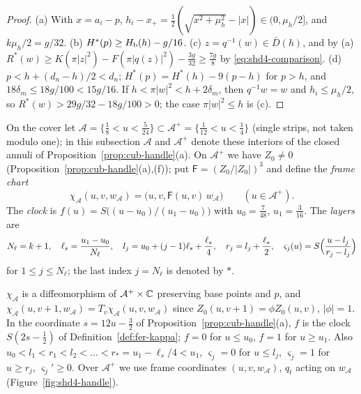 \begin{proof}
(a) With $x=a_i-p$, $h_i-x_+=\frac12(\sqrt{x^2+\mu_h^2}-|x|)\in(0,\mu_h/2]$, and $k\mu_h/2=g/32$.
(b) $H^*(p)\ge H_{\mathrm b}(h)-g/16$.
(c) $z=q^{-1}(w)\in\bar D(h)$, and by (a) $R^*(w)\ge K(\pi|z|^2)-F(\pi|q(z)|^2)-\tfrac{3g}{32}\ge\tfrac{7g}8$ by \eqref{eq:shd4-comparison}.
(d) $p<h+(d_n-h)/2<d_n$; $H^*(p)=H^*(h)-9(p-h)$ for $p>h$, and $18\delta_m\le18g/100<15g/16$. If $h<\pi|w|^2<h+2\delta_m$, then $q^{-1}w=w$ and $h_i\le\mu_h/2$, so $R^*(w)>29g/32-18g/100>0$; the case $\pi|w|^2\le h$ is (c).
\end{proof}

\begin{definition}\label{def:shd4-frame}
On the cover let $\mathcal A=\{\frac18<u<\frac5{24}\}\subset\mathcal A^+=\{\frac1{12}<u<\frac14\}$ (single strips, not taken
modulo one); in this subsection $\mathcal A$ and $\mathcal A^+$ denote these interiors of the closed annuli of
Proposition~\ref{prop:cub-handle}(a). On $\mathcal A^+$ we have $Z_0\ne0$ (Proposition~\ref{prop:cub-handle}(a),(f)); put
$\mathsf F=(Z_0/|Z_0|)^3$ and define the \emph{frame chart}
\[
 \chi_{\mathcal A}(u,v,w_{\mathcal A})=\bigl(u,v,\mathsf F(u,v)\,w_{\mathcal A}\bigr)\qquad(u\in\mathcal A^+).
\]
The \emph{clock} is $f(u)=S\bigl((u-u_0)/(u_1-u_0)\bigr)$ with $u_0=\frac7{48}$, $u_1=\frac3{16}$. The \emph{layers} are
\[
 N_\ell=k+1,\quad \ell_s=\frac{u_1-u_0}{N_\ell},\quad l_j=u_0+(j-1)\ell_s+\frac{\ell_s}4,\quad r_j=l_j+\frac{\ell_s}2,\quad
 \varsigma_j(u)=S\Bigl(\frac{u-l_j}{r_j-l_j}\Bigr)
\]
for $1\le j\le N_\ell$; the last index $j=N_\ell$ is denoted by $*$.
\end{definition}

$\chi_{\mathcal A}$ is a diffeomorphism of $\mathcal A^+\times\mathbb{C}$ preserving base points and $p$, and $\chi_{\mathcal A}(u,v+1,w_{\mathcal A})=T_v\chi_{\mathcal A}(u,v,w_{\mathcal A})$ since $Z_0(u,v+1)=\phi Z_0(u,v)$, $|\phi|=1$. In the coordinate $s=12u-\frac32$ of Proposition~\ref{prop:cub-handle}(a), $f$ is the clock $S(2s-\frac12)$ of Definition~\ref{def:fer-kappa}; $f=0$ for $u\le u_0$, $f=1$ for $u\ge u_1$. Also $u_0<l_1<r_1<l_2<\dots<r_*=u_1-\ell_s/4<u_1$, $\varsigma_j=0$ for $u\le l_j$, $\varsigma_j=1$ for $u\ge r_j$, $\varsigma_j'\ge0$. Over $\mathcal A^+$ we use frame coordinates $(u,v,w_{\mathcal A})$, $q_t$ acting on $w_{\mathcal A}$ (Figure~\ref{fig:shd4-handle}).

